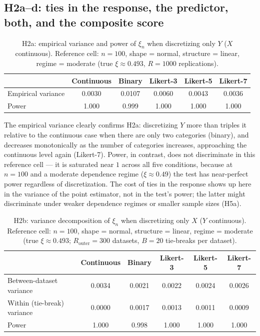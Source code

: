 \documentclass[article]{ajs}
\begin{document}
\subsection{H2a--d: ties in the response, the predictor, both, and the composite score}

\begin{table}[H]
\caption{\label{tab:h2a}H2a: empirical variance and power of $\xi_n$ when discretizing only $Y$ ($X$ continuous). Reference cell: $n=100$, shape = normal, structure = linear, regime = moderate (true $\xi \approx 0.493$, $R=1000$ replications).}
\begin{center}
\begin{tabular}{lccccc}
\toprule
 & Continuous & Binary & Likert-3 & Likert-5 & Likert-7 \\
\midrule
Empirical variance & 0.0030 & 0.0107 & 0.0060 & 0.0043 & 0.0036 \\
Power          & 1.000  & 0.999  & 1.000  & 1.000  & 1.000  \\
\bottomrule
\end{tabular}
\end{center}
\end{table}

The empirical variance clearly confirms H2a: discretizing $Y$ more
than triples it relative to the continuous case when there are only
two categories (binary), and decreases monotonically as the number of
categories increases, approaching the continuous level again
(Likert-7). Power, in contrast, does not discriminate in this
reference cell --- it is saturated near $1$ across all five
conditions, because at $n=100$ and a moderate dependence regime
($\xi \approx 0.49$) the test has near-perfect power regardless of
discretization. The cost of ties in the response shows up here in the
variance of the point estimator, not in the test's power; the latter
might discriminate under weaker dependence regimes or smaller sample
sizes (H5a).

\begin{table}[H]
\caption{\label{tab:h2b}H2b: variance decomposition of $\xi_n$ when discretizing only $X$ ($Y$ continuous). Reference cell: $n=100$, shape = normal, structure = linear, regime = moderate (true $\xi \approx 0.493$; $R_{\text{outer}}=300$ datasets, $B=20$ tie-breaks per dataset).}
\begin{center}
\begin{tabular}{lccccc}
\toprule
 & Continuous & Binary & Likert-3 & Likert-5 & Likert-7 \\
\midrule
Between-dataset variance & 0.0034 & 0.0021 & 0.0022 & 0.0024 & 0.0026 \\
Within (tie-break) variance       & 0.0000 & 0.0017 & 0.0013 & 0.0011 & 0.0009 \\
Power                          & 1.000  & 0.998  & 1.000  & 1.000  & 1.000  \\
\bottomrule
\end{tabular}
\end{center}
\end{table}
\end{document}
